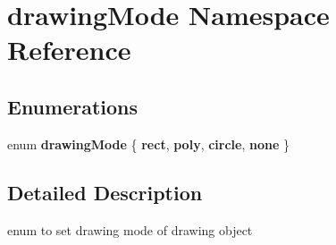 \hypertarget{namespacedrawing_mode}{}\section{drawing\+Mode Namespace Reference}
\label{namespacedrawing_mode}
\subsection*{Enumerations}
\begin{DoxyCompactItemize}
\item 
\mbox{\label{namespacedrawing_mode_a837b7ad68d5b9f106bd4ee713bd70fae}} 
enum {\bfseries drawing\+Mode} \{ {\bfseries rect}, 
{\bfseries poly}, 
{\bfseries circle}, 
{\bfseries none}
 \}
\end{DoxyCompactItemize}


\subsection{Detailed Description}
enum to set drawing mode of drawing object 